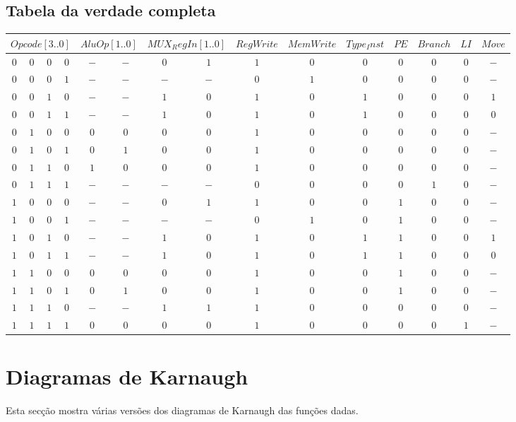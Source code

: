 \documentclass [15pt,a4paper,twoside]{article}
\begin{document}
\subsection{Tabela da verdade completa}
\begin{center}
\begin{tabular}{cccc|ccccccccccc}
\multicolumn{4}{c|}{$Opcode[3..0]$}&\multicolumn{2}{c}{$AluOp[1..0]$}&\multicolumn{2}{c}{$MUX_RegIn[1..0]$}&$RegWrite$&$MemWrite$&$Type_Inst$&$PE$&$Branch$&$LI$&$Move$\\
\hline
$0$&$0$&$0$&$0$&$-$&$-$&$0$&$1$&$1$&$0$&$0$&$0$&$0$&$0$&$-$\\
$0$&$0$&$0$&$1$&$-$&$-$&$-$&$-$&$0$&$1$&$0$&$0$&$0$&$0$&$-$\\
$0$&$0$&$1$&$0$&$-$&$-$&$1$&$0$&$1$&$0$&$1$&$0$&$0$&$0$&$1$\\
$0$&$0$&$1$&$1$&$-$&$-$&$1$&$0$&$1$&$0$&$1$&$0$&$0$&$0$&$0$\\
$0$&$1$&$0$&$0$&$0$&$0$&$0$&$0$&$1$&$0$&$0$&$0$&$0$&$0$&$-$\\
$0$&$1$&$0$&$1$&$0$&$1$&$0$&$0$&$1$&$0$&$0$&$0$&$0$&$0$&$-$\\
$0$&$1$&$1$&$0$&$1$&$0$&$0$&$0$&$1$&$0$&$0$&$0$&$0$&$0$&$-$\\
$0$&$1$&$1$&$1$&$-$&$-$&$-$&$-$&$0$&$0$&$0$&$0$&$1$&$0$&$-$\\
$1$&$0$&$0$&$0$&$-$&$-$&$0$&$1$&$1$&$0$&$0$&$1$&$0$&$0$&$-$\\
$1$&$0$&$0$&$1$&$-$&$-$&$-$&$-$&$0$&$1$&$0$&$1$&$0$&$0$&$-$\\
$1$&$0$&$1$&$0$&$-$&$-$&$1$&$0$&$1$&$0$&$1$&$1$&$0$&$0$&$1$\\
$1$&$0$&$1$&$1$&$-$&$-$&$1$&$0$&$1$&$0$&$1$&$1$&$0$&$0$&$0$\\
$1$&$1$&$0$&$0$&$0$&$0$&$0$&$0$&$1$&$0$&$0$&$1$&$0$&$0$&$-$\\
$1$&$1$&$0$&$1$&$0$&$1$&$0$&$0$&$1$&$0$&$0$&$1$&$0$&$0$&$-$\\
$1$&$1$&$1$&$0$&$-$&$-$&$1$&$1$&$1$&$0$&$0$&$0$&$0$&$0$&$-$\\
$1$&$1$&$1$&$1$&$0$&$0$&$0$&$0$&$1$&$0$&$0$&$0$&$0$&$1$&$-$\\

\end{tabular}
\end{center}
\section{Diagramas de Karnaugh}
Esta secção mostra várias versões dos diagramas de Karnaugh das funções dadas.
\end{document}
